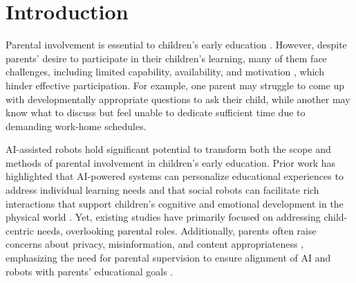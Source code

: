 \section{Introduction}

Parental involvement is essential to children's early education \cite{ma2016meta, harris2008parents}. However, despite parents' desire to participate in their children's learning, many of them face challenges, including limited capability, availability, and motivation \cite{green2007parents, ho2024s, hara1998parent}, which hinder effective participation. For example, one parent may struggle to come up with developmentally appropriate questions to ask their child, while another may know what to discuss but feel unable to dedicate sufficient time due to demanding work-home schedules. 

AI-assisted robots hold significant potential to transform both the scope and methods of parental involvement in children's early education. Prior work has highlighted that AI-powered systems can personalize educational experiences to address individual learning needs \cite{zhang2024mathemyths, xu2022elinor, xu2024artificial} and that social robots can facilitate rich interactions that support children's cognitive and emotional development in the physical world \cite{ho2023designing, leyzberg2012physical, belpaeme2018social, kim2024understanding, lee2022unboxing}. Yet, existing studies have primarily focused on addressing child-centric needs, overlooking parental roles. Additionally, parents often raise concerns about privacy, misinformation, and content appropriateness \cite{oswald2020psychological, david2007electronic, howard2021digital}, emphasizing the need for parental supervision to ensure alignment of AI and robots with parents' educational goals \cite{ho2024s, han2024teachers}.

